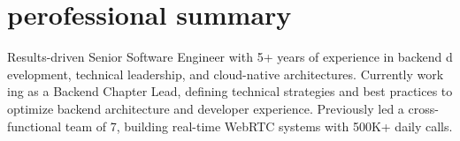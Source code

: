 \documentclass[a4paper,20pt]{article}
\begin{document}
\begin{minipage}[t]{0.65\textwidth}
  \preparetopsec
  \section{perofessional summary}
    \begin{justify}
      \begin{footnotesize}
Results-driven Senior Software Engineer with 5+ years of experience in backend d
evelopment, technical leadership, and cloud-native architectures. Currently work
ing as a Backend Chapter Lead, defining technical strategies and best practices 
to optimize backend architecture and developer experience. Previously led a cross-functional 
team of 7, building real-time WebRTC systems with 500K+ daily calls.
      \end{footnotesize}
    \end{justify}
  \preparenormalsec

\end{minipage}
\end{document}
